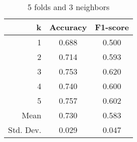 \begin{table}
\centering
\caption{5 folds and 3 neighbors}
\begin{tabular}{rcc}
\toprule
         k &  Accuracy &  F1-score \\
\midrule
         1 &     0.688 &     0.500 \\
         2 &     0.714 &     0.593 \\
         3 &     0.753 &     0.620 \\
         4 &     0.740 &     0.600 \\
         5 &     0.757 &     0.602 \\
      Mean &     0.730 &     0.583 \\
 Std. Dev. &     0.029 &     0.047 \\
\bottomrule
\end{tabular}
\end{table}
